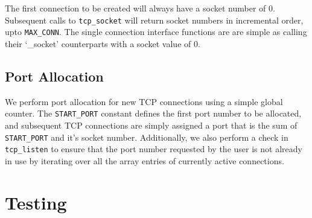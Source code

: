 \documentclass{article}
\begin{document}
The first connection to be created will always have a socket number of 0. Subsequent calls to \texttt{tcp\_socket} will return socket numbers in incremental order, upto \texttt{MAX\_CONN}. The single connection interface functions are are simple as calling their `\_socket' counterparts with a socket value of 0.

\subsection{Port Allocation}
We perform port allocation for new TCP connections using a simple global counter. The \texttt{START\_PORT} constant defines the first port number to be allocated, and subsequent TCP connections are simply assigned a port that is the sum of \texttt{START\_PORT} and it's socket number. Additionally, we also perform a check in \texttt{tcp\_listen} to ensure that the port number requested by the user is not already in use by iterating over all the array entries of currently active connections.
\section{Testing}
\end{document}
